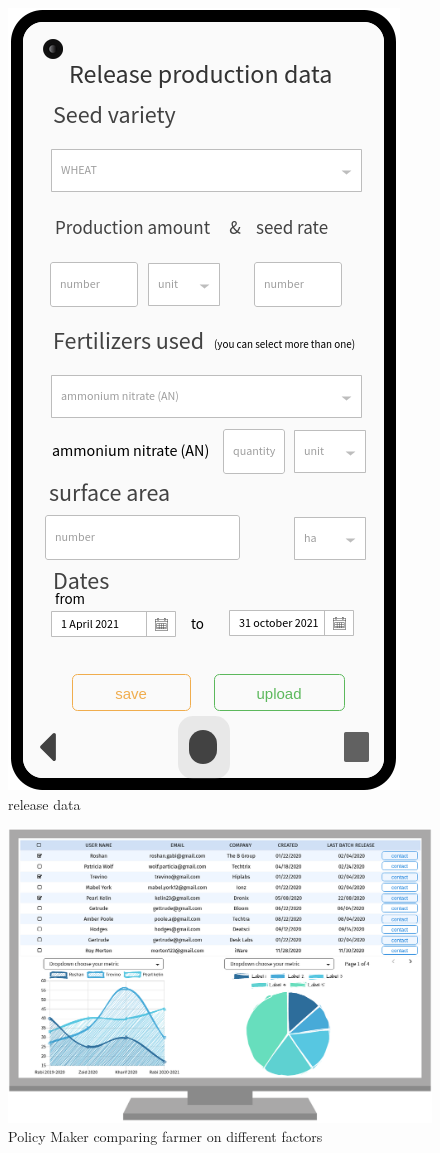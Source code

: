 \begin{figure}[H]
\begin{minipage}{0.48\textwidth}
		\label{Fig:interface_meteo}
		
	\end{minipage}\hfill
	
\end{figure}

\begin{figure}[H]
	
	\centering
	
	\includegraphics[width=0.3\columnwidth]{Images/release_prod_data.png}
	
	\caption{release data}
	
	\label{Fig:interface_release_data}
	
\end{figure}

\begin{figure}[H]
	
	\centering
	
	\includegraphics[width=0.8\columnwidth]{Images/release_data_interface.png}
	
	\caption{Policy Maker comparing farmer on different factors}
	
	\label{Fig:interface_visu_farmers}
	
\end{figure}




